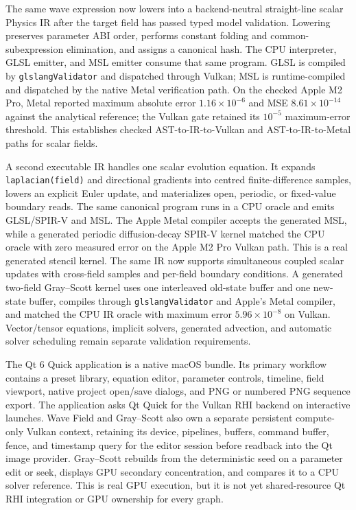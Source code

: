 \documentclass[10pt]{article}
\begin{document}
The same wave expression now lowers into a backend-neutral straight-line scalar Physics IR after
the target field has passed typed model validation. Lowering preserves parameter ABI order,
performs constant folding and common-subexpression elimination, and assigns a canonical hash. The
CPU interpreter, GLSL emitter, and MSL emitter consume that same program. GLSL is compiled by
\texttt{glslangValidator} and dispatched through Vulkan; MSL is runtime-compiled and dispatched by
the native Metal verification path. On the checked Apple M2 Pro, Metal reported maximum absolute
error $1.16\times10^{-6}$ and MSE $8.61\times10^{-14}$ against the analytical reference; the Vulkan
gate retained its $10^{-5}$ maximum-error threshold. This establishes checked
AST-to-IR-to-Vulkan and AST-to-IR-to-Metal paths for scalar fields.

A second executable IR handles one scalar evolution equation. It expands
\texttt{laplacian(field)} and directional gradients into centred finite-difference samples,
lowers an explicit Euler update, and materializes open, periodic, or fixed-value boundary reads.
The same canonical program runs in a CPU oracle and emits GLSL/SPIR-V and MSL. The Apple Metal
compiler accepts the generated MSL, while a generated periodic diffusion-decay SPIR-V kernel
matched the CPU oracle with zero measured error on the Apple M2 Pro Vulkan path. This is a real
generated stencil kernel. The same IR now supports simultaneous coupled scalar updates with
cross-field samples and per-field boundary conditions. A generated two-field Gray--Scott kernel
uses one interleaved old-state buffer and one new-state buffer, compiles through
\texttt{glslangValidator} and Apple's Metal compiler, and matched the CPU IR oracle with maximum
error $5.96\times10^{-8}$ on Vulkan. Vector/tensor equations, implicit solvers, generated
advection, and automatic solver scheduling remain separate validation requirements.

The Qt 6 Quick application is a native macOS bundle. Its primary workflow contains a preset library,
equation editor, parameter controls, timeline, field viewport, native project open/save dialogs,
and PNG or numbered PNG sequence export. The application asks Qt Quick for the Vulkan RHI backend
on interactive launches. Wave Field and Gray--Scott also own a separate persistent compute-only
Vulkan context, retaining its device, pipelines, buffers, command buffer, fence, and timestamp
query for the editor session before readback into the Qt image provider. Gray--Scott rebuilds from
the deterministic seed on a parameter edit or seek, displays GPU secondary concentration, and
compares it to a CPU solver reference. This is real GPU execution, but it is not yet shared-resource
Qt RHI integration or GPU ownership for every graph.
\end{document}
